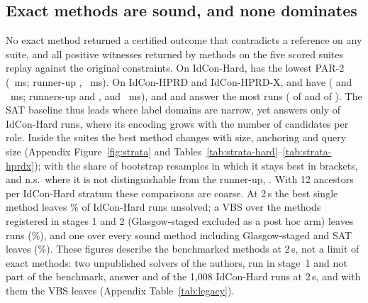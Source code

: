 \subsection{Exact methods are sound, and none dominates}
\label{sec:exact}
No exact method returned a certified outcome that contradicts a reference on any suite, and all \witnessTotalRtwo{} positive witnesses returned by methods on the five scored suites replay against the original constraints. On IdCon-Hard, \hardBest{} has the lowest PAR-2 (\hardBestPar~ms; runner-up \hardSecond{}, \hardSecondPar~ms). On IdCon-HPRD and IdCon-HPRD-X, \hprdBest{} and \hprdxBest{} have (\hprdBestPar{} and \hprdxBestPar~ms; runners-up \hprdSecond{} and \hprdxSecond{}, \hprdSecondPar{} and \hprdxSecondPar~ms), and \hprdMost{} and \hprdxMost{} answer the most runs (\hprdMostCorrect{} of \hprdASPcautiousAssessed{} and \hprdxMostCorrect{} of \hprdxASPcautiousAssessed{}). The SAT baseline thus leads where label domains are narrow, yet answers only \hardSATCorrect{} of \hardSATAssessed{} IdCon-Hard runs, where its encoding grows with the number of candidates per role. Inside the suites the best method changes with size, anchoring and query size (Appendix Figure~\ref{fig:strata} and Tables~\ref{tab:strata-hard}--\ref{tab:strata-hprdx}); with the share of bootstrap resamples in which it stays best in brackets, and n.s.\ where it is not distinguishable from the runner-up, \strataSentence{}. With 12 ancestors per IdCon-Hard stratum these comparisons are coarse. At 2\,s the best single method leaves \hardBestUnsolvedPct\% of IdCon-Hard runs unsolved; a VBS over the methods registered in stages 1 and 2 (Glasgow-staged excluded as a post hoc arm) leaves \hardVBSUnsolved{} runs (\hardVBSUnsolvedPct\%), and one over every sound method including Glasgow-staged and SAT leaves \hardVBSAllUnsolved{} (\hardVBSAllUnsolvedPct\%). These figures describe the benchmarked methods at 2\,s, not a limit of exact methods: two unpublished solvers of the authors, run in stage~1 and not part of the benchmark, answer \legEgCorrect{} and \legSvCorrect{} of the 1,008 IdCon-Hard runs at 2\,s, and with them the VBS leaves \legVBSBoth{} (Appendix Table~\ref{tab:legacy}).



